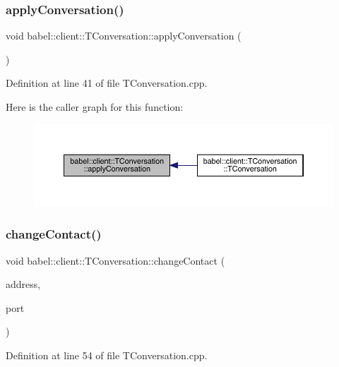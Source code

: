 \subsubsection{\texorpdfstring{apply\+Conversation()}{applyConversation()}}
{\footnotesize\ttfamily void babel\+::client\+::\+T\+Conversation\+::apply\+Conversation (\begin{DoxyParamCaption}{ }\end{DoxyParamCaption})}



Definition at line 41 of file T\+Conversation.\+cpp.

Here is the caller graph for this function\+:\nopagebreak
\begin{figure}[H]
\begin{center}
\leavevmode
\includegraphics[width=350pt]{classbabel_1_1client_1_1_t_conversation_a074db94766570fa34b503baac6d67008_icgraph}
\end{center}
\end{figure}
\mbox{\label{classbabel_1_1client_1_1_t_conversation_a44c07d53a365ecfe1967d74569da15f3}} 
\subsubsection{\texorpdfstring{change\+Contact()}{changeContact()}}
{\footnotesize\ttfamily void babel\+::client\+::\+T\+Conversation\+::change\+Contact (\begin{DoxyParamCaption}\item[{Q\+String}]{address,  }\item[{int}]{port }\end{DoxyParamCaption})}



Definition at line 54 of file T\+Conversation.\+cpp.

\mbox{\label{classbabel_1_1client_1_1_t_conversation_a6dedd929e9338f84480f23d3674be25d}} 
